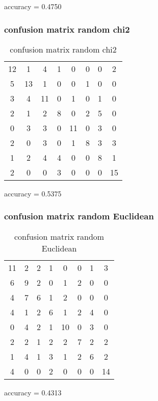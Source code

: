 \documentclass[12pt]{article}
\begin{document}
accuracy = 0.4750


\subsubsection{confusion matrix random chi2}
\begin{table}[H]
\centering
\begin{tabular}{c c c c c c c c}
    12 &     1 &     4 &     1 &     0 &     0 &     0 &     2 \\
     5 &    13 &     1 &     0 &     0 &     1 &     0 &     0 \\
     3 &     4 &    11 &     0 &     1 &     0 &     1 &     0 \\
     2 &     1 &     2 &     8 &     0 &     2 &     5 &     0 \\
     0 &     3 &     3 &     0 &    11 &     0 &     3 &     0 \\
     2 &     0 &     3 &     0 &     1 &     8 &     3 &     3 \\
     1 &     2 &     4 &     4 &     0 &     0 &     8 &     1 \\
     2 &     0 &     0 &     3 &     0 &     0 &     0 &    15 \\
\end{tabular}
\caption{confusion matrix random chi2}
\label{table:randomchi2}
\end{table}

accuracy = 0.5375

\subsubsection{confusion matrix random Euclidean}
\begin{table}[H]
\centering
\begin{tabular}{c c c c c c c c}
    11 &     2 &     2 &     1 &     0 &     0 &     1 &     3 \\
     6 &     9 &     2 &     0 &     1 &     2 &     0 &     0 \\
     4 &     7 &     6 &     1 &     2 &     0 &     0 &     0 \\
     4 &     1 &     2 &     6 &     1 &     2 &     4 &     0 \\
     0 &     4 &     2 &     1 &    10 &     0 &     3 &     0 \\
     2 &     2 &     1 &     2 &     2 &     7 &     2 &     2 \\
     1 &     4 &     1 &     3 &     1 &     2 &     6 &     2 \\
     4 &     0 &     0 &     2 &     0 &     0 &     0 &    14 
\end{tabular}
\caption{confusion matrix random Euclidean}
\label{table:randomeuc}
\end{table}

accuracy =  0.4313
\end{document}
